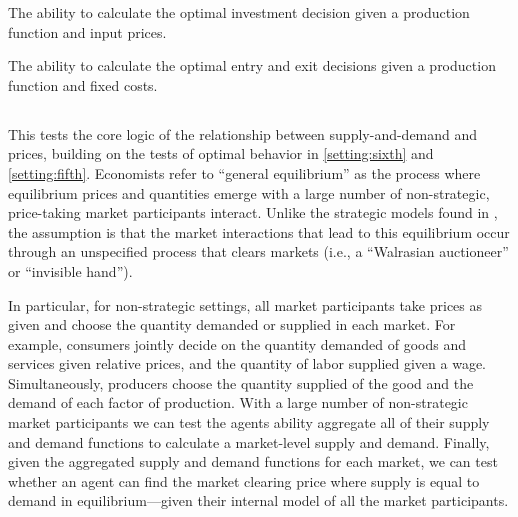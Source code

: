 \begin{el}\label{el:dynamic_profit_max}
    {The ability to calculate the optimal investment decision given a production function and input prices.}
\end{el}

\begin{el}
    {The ability to calculate the optimal entry and exit decisions given a production function and fixed costs.}
\end{el}





\subsection{\seventhParent}\label{setting:seventh}
This \parent tests the core logic of the relationship between supply-and-demand and prices, building on the tests of optimal behavior in \cref{setting:sixth} and \cref{setting:fifth}.  Economists refer to ``general equilibrium'' as the process where equilibrium prices and quantities emerge with a large number of non-strategic, price-taking market participants interact.  Unlike the strategic models found in \steer, the assumption is that the market interactions that lead to this equilibrium occur through an unspecified process that clears markets (i.e., a ``Walrasian auctioneer'' or ``invisible hand'').

In particular, for non-strategic settings, all market participants take prices as given and choose the quantity demanded or supplied in each market.  For example, consumers jointly decide on the quantity demanded of goods and services given relative prices, and the quantity of labor supplied given a wage.  Simultaneously, producers choose the quantity supplied of the good and the demand of each factor of production.  With a large number of non-strategic market participants we can test the agents ability aggregate all of their supply and demand functions to calculate a market-level supply and demand.  Finally, given the aggregated supply and demand functions for each market, we can test whether an agent can find the market clearing price where supply is equal to demand in equilibrium---given their internal model of all the market participants.

